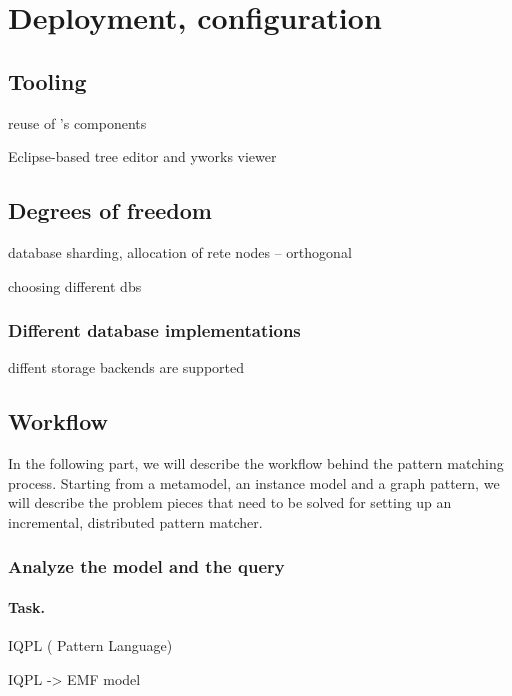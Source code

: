 \section{Deployment, configuration}
\label{sec:deployment-configuration}

\subsection{Tooling}

reuse of \eiq's components

Eclipse-based tree editor and yworks viewer


\subsection{Degrees of freedom}

database sharding, allocation of rete nodes -- orthogonal

choosing different dbs

\subsubsection{Different database implementations}

diffent storage backends are supported



\subsection{Workflow} %

In the following part, we will describe the workflow behind the pattern matching process. Starting from a metamodel, an instance model and a graph pattern, we will describe the problem pieces that need to be solved for setting up an incremental, distributed pattern matcher.


\subsubsection{Analyze the model and the query}

\paragraph{Task.} IQPL (\iq{} Pattern Language)

IQPL -> EMF model

